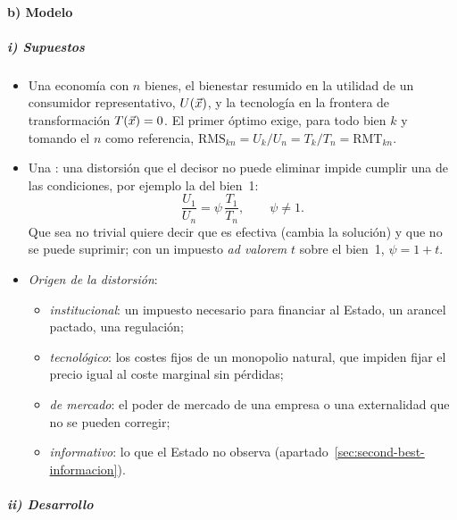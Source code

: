\documentclass[11pt]{article}
\begin{document}
\paragraph{b) Modelo}

\subparagraph{i) Supuestos}

\begin{itemize}
\item Una economía con $n$ bienes, el bienestar resumido en la utilidad de un consumidor representativo, $U(\vec{x})$, y la tecnología en la frontera de transformación $T(\vec{x})=0$. El primer óptimo exige, para todo bien $k$ y tomando el $n$ como referencia, $\mathrm{RMS}_{kn}=U_k/U_n=T_k/T_n=\mathrm{RMT}_{kn}$.
\item Una : una distorsión que el decisor no puede eliminar impide cumplir una de las condiciones, por ejemplo la del bien~1:
$$\frac{U_1}{U_n}=\psi\,\frac{T_1}{T_n},\qquad \psi\neq1.$$
  Que sea no trivial quiere decir que es efectiva (cambia la solución) y que no se puede suprimir; con un impuesto \emph{ad valorem} $t$ sobre el bien~1, $\psi=1+t$.
\item \emph{Origen de la distorsión}:
  \begin{itemize}
  \item \emph{institucional}: un impuesto necesario para financiar al Estado, un arancel pactado, una regulación;
  \item \emph{tecnológico}: los costes fijos de un monopolio natural, que impiden fijar el precio igual al coste marginal sin pérdidas;
  \item \emph{de mercado}: el poder de mercado de una empresa o una externalidad que no se pueden corregir;
  \item \emph{informativo}: lo que el Estado no observa (apartado~\ref{sec:second-best-informacion}).
  \end{itemize}
\end{itemize}

\subparagraph{ii) Desarrollo}
\end{document}
